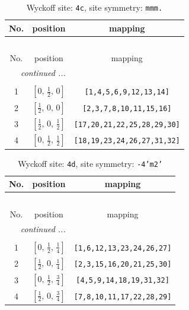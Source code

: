 \documentclass[fleqn,8pt]{jsarticle}
\begin{document}
\renewcommand{\arraystretch}{1.2}
\begin{longtable}{ccc}
\caption{Wyckoff site: {\tt 4c}, site symmetry: {\tt mmm.}}
 \\
 \hline \hline
No. & position & mapping \\ \hline \endfirsthead

\multicolumn{2}{l}{\tablename\ \thetable{}} \\
 \hline \hline
No. & position & mapping \\ \hline \endhead

 \hline \hline
\multicolumn{2}{r}{\footnotesize\it continued ...} \\ \endfoot

 \hline \hline
\multicolumn{2}{r}{} \\ \endlastfoot

1 & $\left[ 0,\, \frac{1}{2},\, 0 \right]$ & {\tt [1,4,5,6,9,12,13,14]} \\ \hline
2 & $\left[ \frac{1}{2},\, 0,\, 0 \right]$ & {\tt [2,3,7,8,10,11,15,16]} \\ \hline
3 & $\left[ \frac{1}{2},\, 0,\, \frac{1}{2} \right]$ & {\tt [17,20,21,22,25,28,29,30]} \\ \hline
4 & $\left[ 0,\, \frac{1}{2},\, \frac{1}{2} \right]$ & {\tt [18,19,23,24,26,27,31,32]} \\
\end{longtable}
\renewcommand{\arraystretch}{1.2}
\begin{longtable}{ccc}
\caption{Wyckoff site: {\tt 4d}, site symmetry: {\tt -4'm2'}}
 \\
 \hline \hline
No. & position & mapping \\ \hline \endfirsthead

\multicolumn{2}{l}{\tablename\ \thetable{}} \\
 \hline \hline
No. & position & mapping \\ \hline \endhead

 \hline \hline
\multicolumn{2}{r}{\footnotesize\it continued ...} \\ \endfoot

 \hline \hline
\multicolumn{2}{r}{} \\ \endlastfoot

1 & $\left[ 0,\, \frac{1}{2},\, \frac{1}{4} \right]$ & {\tt [1,6,12,13,23,24,26,27]} \\ \hline
2 & $\left[ \frac{1}{2},\, 0,\, \frac{1}{4} \right]$ & {\tt [2,3,15,16,20,21,25,30]} \\ \hline
3 & $\left[ 0,\, \frac{1}{2},\, \frac{3}{4} \right]$ & {\tt [4,5,9,14,18,19,31,32]} \\ \hline
4 & $\left[ \frac{1}{2},\, 0,\, \frac{3}{4} \right]$ & {\tt [7,8,10,11,17,22,28,29]} \\
\end{longtable}
\end{document}
